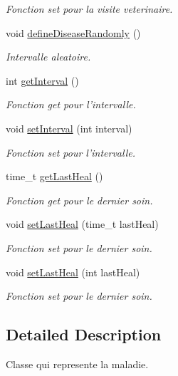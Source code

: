 \begin{DoxyCompactItemize}
\begin{DoxyCompactList}\small\item\em Fonction set pour la visite veterinaire. \end{DoxyCompactList}\item 
void \hyperlink{class_disease_aa373f80e471a49ccee9820f9fc3efd1e}{define\+Disease\+Randomly} ()
\begin{DoxyCompactList}\small\item\em Intervalle aleatoire. \end{DoxyCompactList}\item 
int \hyperlink{class_disease_aabda1914662dcb4cd12188e4448eb690}{get\+Interval} ()
\begin{DoxyCompactList}\small\item\em Fonction get pour l'intervalle. \end{DoxyCompactList}\item 
void \hyperlink{class_disease_a9fca06529cf279baafe9a9ff5dfef631}{set\+Interval} (int interval)
\begin{DoxyCompactList}\small\item\em Fonction set pour l'intervalle. \end{DoxyCompactList}\item 
time\+\_\+t \hyperlink{class_disease_a21665bc6037cbff57e7ff277d741326c}{get\+Last\+Heal} ()
\begin{DoxyCompactList}\small\item\em Fonction get pour le dernier soin. \end{DoxyCompactList}\item 
void \hyperlink{class_disease_aa2fbecc3a6d6747d8191c95760f71796}{set\+Last\+Heal} (time\+\_\+t last\+Heal)
\begin{DoxyCompactList}\small\item\em Fonction set pour le dernier soin. \end{DoxyCompactList}\item 
void \hyperlink{class_disease_a41b447b0f21944b402c9e0406f406a51}{set\+Last\+Heal} (int last\+Heal)
\begin{DoxyCompactList}\small\item\em Fonction set pour le dernier soin. \end{DoxyCompactList}\end{DoxyCompactItemize}


\subsection{Detailed Description}
Classe qui represente la maladie. 

